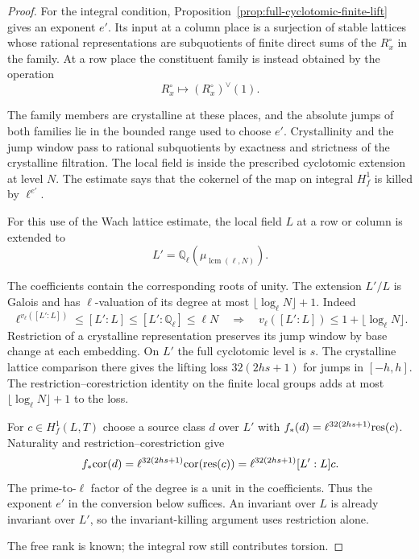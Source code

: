 \begin{proof}
For the integral condition, Proposition~\ref{prop:full-cyclotomic-finite-lift} gives an exponent \(e'\). Its input at a
column place is a surjection of stable lattices whose
rational representations are subquotients of finite
direct sums of the \(R_x^\circ\) in the family. At a row place the constituent family is instead obtained by the operation
\[
 R_x^\circ\longmapsto (R_x^\circ)^\vee(1).
\]

The family members are crystalline at these places,
and the absolute jumps of both families lie in the
bounded range used to choose \(e'\). Crystallinity and
the jump window pass to rational subquotients by
exactness and strictness of the crystalline filtration.
The local field is inside the prescribed cyclotomic
extension at level \(N\). The estimate says that the
cokernel of the map on integral \(H^1_f\) is killed
by \(\ell^{e'}\).

For this use of the Wach lattice estimate, the local
field \(L\) at a row or column is extended to
\[
 L'=\mathbb Q_\ell(\mu_{\operatorname{lcm}(\ell,N)}).
\]

The coefficients contain the corresponding roots of
unity. The extension \(L'/L\) is Galois and has
\(\ell\)-valuation of its degree at most
\(\lfloor\log_\ell N\rfloor+1\). Indeed
\[
 \ell^{v_\ell([L':L])}\le[L':L]\le[L':\mathbb Q_\ell]\le\ell N
 \quad\Longrightarrow\quad
 v_\ell([L':L])\le1+\lfloor\log_\ell N\rfloor .
\]
Restriction of a crystalline representation preserves
its jump window by base change at each embedding.
On \(L'\) the full cyclotomic level is \(s\).
The crystalline lattice comparison there gives the
lifting loss \(32(2hs+1)\) for jumps in \([-h,h]\).
The restriction--corestriction identity on the
finite local groups adds at most
\(\lfloor\log_\ell N\rfloor+1\) to the loss.

For \(c\in H^1_f(L,T)\) choose a source class \(d\)
over \(L'\) with \(f_*(d)=\ell^{32(2hs+1)}{\rm res}(c)\).
Naturality and restriction--corestriction give
\[
 f_*{\rm cor}(d)
   =\ell^{32(2hs+1)}{\rm cor}({\rm res}(c))
   =\ell^{32(2hs+1)}[L':L]c .
\] The prime-to-\(\ell\)
factor of the degree is a unit in the coefficients.
Thus the exponent \(e'\) in the conversion below
suffices. An invariant over \(L\) is already invariant
over \(L'\), so the invariant-killing argument uses
restriction alone.

The free rank is known; the integral row still contributes torsion.


\end{proof}
